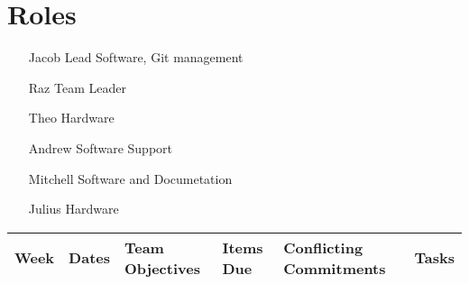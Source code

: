 
\section*{Roles}
\begin{itemize}
    \item[Jacob] Lead Software, Git management
    \item[Raz] Team Leader
    \item[Theo] Hardware
    \item[Andrew] Software Support
    \item[Mitchell] Software and Documetation
    \item[Julius] Hardware
\end{itemize}
\begin{tabular}{|l|l|l|l|l|l|}
\hline
\textbf{Week} & \textbf{Dates} & \textbf{Team Objectives} & \textbf{Items Due} &
\textbf{Conflicting Commitments} & \textbf{Tasks} \\ \hline \hline
\end{tabular}
